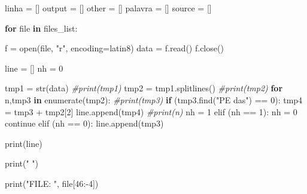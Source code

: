 \documentclass[
  12pt,
]{article}
\newenvironment{Shaded}{\begin{snugshade}}{\end{snugshade}}
\newcommand{\AttributeTok}[1]{\textcolor[rgb]{0.77,0.63,0.00}{#1}}
\newcommand{\CommentTok}[1]{\textcolor[rgb]{0.56,0.35,0.01}{\textit{#1}}}
\newcommand{\ControlFlowTok}[1]{\textcolor[rgb]{0.13,0.29,0.53}{\textbf{#1}}}
\newcommand{\DecValTok}[1]{\textcolor[rgb]{0.00,0.00,0.81}{#1}}
\newcommand{\FunctionTok}[1]{\textcolor[rgb]{0.00,0.00,0.00}{#1}}
\newcommand{\NormalTok}[1]{#1}
\newcommand{\OtherTok}[1]{\textcolor[rgb]{0.56,0.35,0.01}{#1}}
\newcommand{\SpecialCharTok}[1]{\textcolor[rgb]{0.00,0.00,0.00}{#1}}
\newcommand{\StringTok}[1]{\textcolor[rgb]{0.31,0.60,0.02}{#1}}
\begin{document}
\begin{Shaded}
\begin{Highlighting}[]
\NormalTok{linha }\OtherTok{=}\NormalTok{ []}
\NormalTok{output }\OtherTok{=}\NormalTok{ []}
\NormalTok{other }\OtherTok{=}\NormalTok{ []}
\NormalTok{palavra }\OtherTok{=}\NormalTok{ []}
\NormalTok{source }\OtherTok{=}\NormalTok{ []}

\ControlFlowTok{for}\NormalTok{ file }\ControlFlowTok{in}\NormalTok{ files\_list}\SpecialCharTok{:}

\NormalTok{    f }\OtherTok{=} \FunctionTok{open}\NormalTok{(file, }\StringTok{"r"}\NormalTok{, }\AttributeTok{encoding=}\StringTok{\textquotesingle{}latin8\textquotesingle{}}\NormalTok{)}
\NormalTok{    data }\OtherTok{=} \FunctionTok{f.read}\NormalTok{()}
    \FunctionTok{f.close}\NormalTok{()}

\NormalTok{    line }\OtherTok{=}\NormalTok{ []}
\NormalTok{    nh }\OtherTok{=} \DecValTok{0}

\NormalTok{    tmp1 }\OtherTok{=} \FunctionTok{str}\NormalTok{(data)}
    \CommentTok{\#print(tmp1)}
\NormalTok{    tmp2 }\OtherTok{=} \FunctionTok{tmp1.splitlines}\NormalTok{()}
    \CommentTok{\#print(tmp2)}
    \ControlFlowTok{for}\NormalTok{ n,tmp3 }\ControlFlowTok{in} \FunctionTok{enumerate}\NormalTok{(tmp2)}\SpecialCharTok{:}
        \CommentTok{\#print(tmp3)}
        \ControlFlowTok{if}\NormalTok{ (}\FunctionTok{tmp3.find}\NormalTok{(}\StringTok{"PE das"}\NormalTok{) }\SpecialCharTok{==} \DecValTok{0}\NormalTok{)}\SpecialCharTok{:}
\NormalTok{            tmp4 }\OtherTok{=}\NormalTok{ tmp3 }\SpecialCharTok{+}\NormalTok{ tmp2[}\DecValTok{2}\NormalTok{]}
            \FunctionTok{line.append}\NormalTok{(tmp4)}
            \CommentTok{\#print(n)}
\NormalTok{            nh }\OtherTok{=} \DecValTok{1}
        \FunctionTok{elif}\NormalTok{ (nh }\SpecialCharTok{==} \DecValTok{1}\NormalTok{)}\SpecialCharTok{:}
\NormalTok{            nh }\OtherTok{=} \DecValTok{0}
\NormalTok{            continue}
        \FunctionTok{elif}\NormalTok{ (nh }\SpecialCharTok{==} \DecValTok{0}\NormalTok{)}\SpecialCharTok{:}
            \FunctionTok{line.append}\NormalTok{(tmp3)}

    \FunctionTok{print}\NormalTok{(line)}

    \FunctionTok{print}\NormalTok{(}\StringTok{"   "}\NormalTok{)}

    \FunctionTok{print}\NormalTok{(}\StringTok{"FILE: "}\NormalTok{, file[}\DecValTok{46}\SpecialCharTok{:{-}}\DecValTok{4}\NormalTok{])}


\end{Highlighting}
\end{Shaded}
\end{document}
